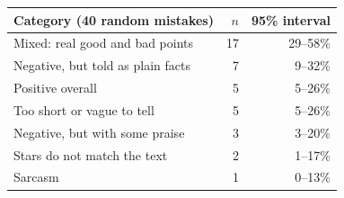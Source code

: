 \begin{tabular}{@{}lrr@{}}
\toprule
Category (40 random mistakes) & $n$ & 95\% interval \\
\midrule
Mixed: real good and bad points & 17 & 29--58\% \\
Negative, but told as plain facts & 7 & 9--32\% \\
Positive overall & 5 & 5--26\% \\
Too short or vague to tell & 5 & 5--26\% \\
Negative, but with some praise & 3 & 3--20\% \\
Stars do not match the text & 2 & 1--17\% \\
Sarcasm & 1 & 0--13\% \\
\bottomrule
\end{tabular}
